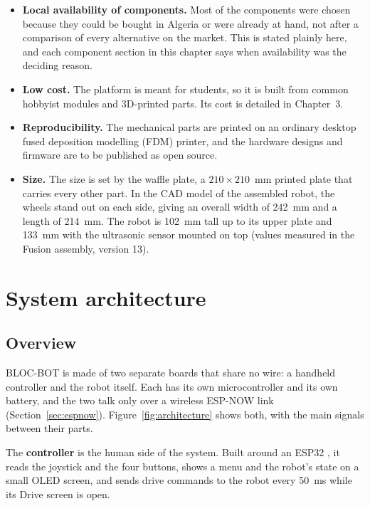 \begin{itemize}
  \item \textbf{Local availability of components.} Most of the components were chosen
        because they could be bought in Algeria or were already at hand, not after a
        comparison of every alternative on the market. This is stated plainly here, and
        each component section in this chapter says when availability was the deciding
        reason.
  \item \textbf{Low cost.} The platform is meant for students, so it is built from common
        hobbyist modules and 3D-printed parts. Its cost is detailed in Chapter~3.
  \item \textbf{Reproducibility.} The mechanical parts are printed on an ordinary
        desktop fused deposition modelling (FDM) printer, and the hardware designs and firmware are to be published
        as open source.
  \item \textbf{Size.} The size is set by the waffle plate, a
        \(210 \times 210\)~mm printed plate that carries every other part. In the CAD
        model of the assembled robot, the wheels stand out on each side, giving an
        overall width of 242~mm and a length of 214~mm. The robot is 102~mm tall up to
        its upper plate and 133~mm with the ultrasonic sensor mounted on top (values
        measured in the Fusion assembly, version 13).
\end{itemize}

\section{System architecture}
\label{sec:architecture}
\subsection{Overview}
BLOC-BOT is made of two separate boards that share no wire: a handheld controller and the
robot itself. Each has its own microcontroller and its own battery, and the two talk
only over a wireless ESP-NOW link \cite{espnow_idf} (Section~\ref{sec:espnow}).
Figure~\ref{fig:architecture} shows both, with the main signals between their parts.

The \textbf{controller} is the human side of the system. Built around an ESP32
\cite{esp32_datasheet}, it reads the joystick and the four buttons, shows a menu and the
robot's state on a small OLED screen, and sends drive commands to the robot every 50~ms
while its Drive screen is open.

